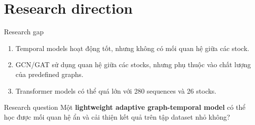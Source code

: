 \documentclass[aspectratio=169,11pt,t]{beamer}
\newcommand{\NumStocks}{26}
\newcommand{\NumSequences}{280}
\newcommand{\keypoint}[1]{%
  \begin{beamercolorbox}[wd=\textwidth,sep=4pt,leftskip=5pt,rightskip=5pt]{keypointbox}
    \footnotesize{} \justifying #1
  \end{beamercolorbox}
}
\begin{document}
\section{Research direction}
\begin{frame}{Research gap}
\begin{enumerate}
  \item Temporal models hoạt động tốt, nhưng không có mối quan hệ giữa các stock.
  \item GCN/GAT sử dụng quan hệ giữa các stocks, nhưng phụ thuộc vào chất lượng của predefined graphs.
  \item Transformer models có thể quá lớn với \NumSequences{} sequences và \NumStocks{} stocks.
\end{enumerate}
\vspace{0.35cm}
\begin{block}{Research question}
Một \textbf{lightweight adaptive graph-temporal model} có thể học được mối quan hệ ẩn và cải thiện kết quả trên tập dataset nhỏ không?
\end{block}
\end{frame}

\end{document}
